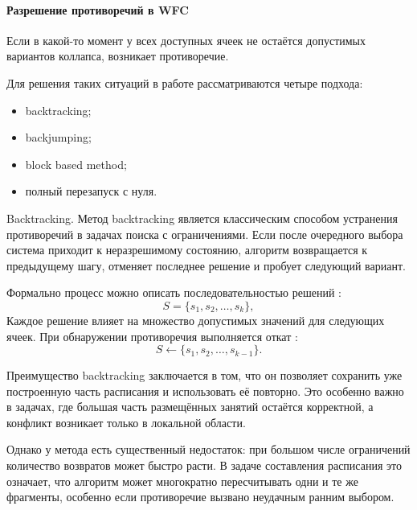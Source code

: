  \paragraph{Разрешение противоречий в WFC}

 Если в какой-то момент у всех доступных ячеек не остаётся допустимых вариантов коллапса, возникает противоречие.

 Для решения таких ситуаций в работе рассматриваются четыре подхода:
 \begin{itemize}
 	\item backtracking;
 	\item backjumping;
 	\item block based method;
 	\item полный перезапуск с нуля.
 \end{itemize}

 Backtracking. Метод backtracking является классическим способом устранения противоречий в задачах поиска с ограничениями.
 Если после очередного выбора система приходит к неразрешимому состоянию, алгоритм возвращается к предыдущему шагу, отменяет последнее решение и пробует следующий вариант.

 Формально процесс можно описать последовательностью решений :
 \begin{equation}
 	S = \{s_1, s_2, \dots, s_k\},
 	\label{eq:backtrack-seq}
 \end{equation}
 Каждое решение влияет на множество допустимых значений для следующих ячеек.
 При обнаружении противоречия выполняется откат :
 \begin{equation}
 	S \leftarrow \{s_1, s_2, \dots, s_{k-1}\}.
 	\label{eq:backtrack-rollback}
 \end{equation}

 Преимущество backtracking заключается в том, что он позволяет сохранить уже построенную часть расписания и использовать её повторно.
 Это особенно важно в задачах, где большая часть размещённых занятий остаётся корректной, а конфликт возникает только в локальной области.

 Однако у метода есть существенный недостаток: при большом числе ограничений количество возвратов может быстро расти.
 В задаче составления расписания это означает, что алгоритм может многократно пересчитывать одни и те же фрагменты, особенно если противоречие вызвано неудачным ранним выбором.

